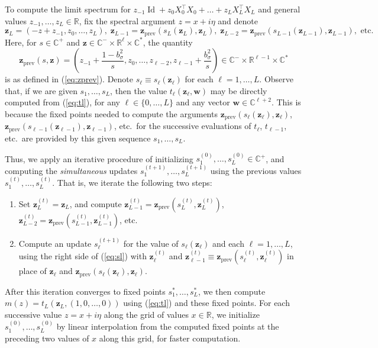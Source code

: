 \documentclass{article}
\theoremstyle{definition}
\newcommand{\R}{\mathbb{R}}
\newcommand{\C}{\mathbb{C}}
\newcommand{\Id}{\operatorname{Id}}
\newcommand{\prev}{{\text{prev}}}
\newcommand{\z}{\mathbf{z}}
\newcommand{\w}{\mathbf{w}}
\newcommand{\1}{\mathbf{1}}
\begin{document}
To compute the limit spectrum for
$z_{-1}\Id+z_0X_0^\top X_0+\ldots+z_LX_L^\top X_L$
and general values $z_{-1},\ldots,z_L \in \R$, fix the spectral argument
$z=x+i\eta$ and denote
\[\z_L=(-z+z_{-1},z_0,\ldots,z_L),\; \z_{L-1}=\z_\prev(s_L(\z_L),\z_L),
\;\z_{L-2}=\z_\prev(s_{L-1}(\z_{L-1}),\z_{L-1}), \text{ etc.}\]
Here, for $s \in \C^+$ and $\z \in \C^- \times \R^\ell \times \C^*$, the
quantity
\[\z_\prev(s,\z)=\left(z_{-1}+\frac{1-b_\sigma^2}{s},z_0,\ldots,
z_{\ell-2},z_{\ell-1}+\frac{b_\sigma^2}{s}\right)
\in \C^- \times \R^{\ell-1} \times \C^*\]
is as defined in (\ref{eq:zprev}).
Denote $s_\ell \equiv s_\ell(\z_\ell)$ for each $\ell=1,\ldots,L$.
Observe that, if we are given $s_1,\ldots,s_L$, then the value
$t_\ell(\z_\ell,\w)$ may be directly computed from (\ref{eq:tl}),
for any $\ell \in \{0,\ldots,L\}$
and any vector $\w \in \C^{\ell+2}$. This is because
the fixed points needed to compute the arguments
$\z_\prev(s_\ell(\z_\ell),\z_\ell)$,
$\z_\prev(s_{\ell-1}(\z_{\ell-1}),\z_{\ell-1})$, etc.\ for the successive
evaluations of $t_\ell$, $t_{\ell-1}$, etc.\ are provided by this given
sequence $s_1,\ldots,s_L$.

Thus, we apply an iterative procedure of initializing
$s_1^{(0)},\ldots,s_L^{(0)} \in \C^+$, and computing the \emph{simultaneous}
updates $s_1^{(t+1)},\ldots,s_L^{(t+1)}$ using the previous values
$s_1^{(t)},\ldots,s_L^{(t)}$. That is, we iterate the following two steps:
\begin{enumerate}
\item Set $\z_L^{(t)}=\z_L$, and compute
$\z_{L-1}^{(t)}=\z_\prev(s_L^{(t)},\z_L^{(t)})$,
$\z_{L-2}^{(t)}=\z_\prev(s_{L-1}^{(t)},\z_{L-1}^{(t)})$, etc.
\item Compute an update $s_\ell^{(t+1)}$ for the value of $s_\ell(\z_\ell)$
and each $\ell=1,\ldots,L$,
using the right side of (\ref{eq:sl}) with $\z_\ell^{(t)}$
and $\z_{\ell-1}^{(t)} \equiv \z_\prev(s_\ell^{(t)},\z_\ell^{(t)})$
in place of $\z_\ell$ and $\z_\prev(s_\ell(\z_\ell),\z_\ell)$.
\end{enumerate}
After this iteration converges to fixed points $s_1^*,\ldots,s_L^*$,
we then compute $m(z)=t_L(\z_L,(1,0,\ldots,0))$ using (\ref{eq:tl}) and
these fixed points. For each successive value $z=x+i\eta$ along the grid of
values $x \in \R$, we initialize $s_1^{(0)},\ldots,s_L^{(0)}$ by linear
interpolation from the computed fixed points at the preceding two values of $x$
along this grid, for faster computation.
\end{document}

